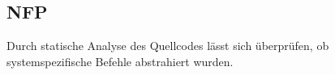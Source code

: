 \subsection*{NFP}

Durch statische Analyse des Quellcodes lässt sich überprüfen, ob systemspezifische Befehle abstrahiert wurden.